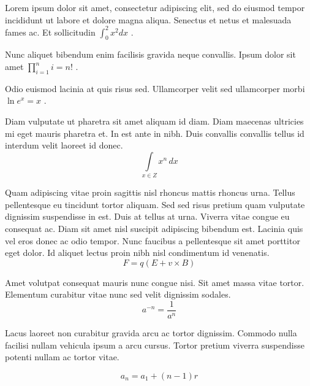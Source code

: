 \documentclass{article}
\begin{document}
Lorem ipsum dolor sit amet, consectetur adipiscing elit, sed do eiusmod tempor incididunt ut labore et dolore magna aliqua. Senectus et netus et malesuada fames ac. Et sollicitudin 
\begin{math}
	\int_0^2x^2dx
\end{math}
.\newline
 
Nunc aliquet bibendum enim facilisis gravida neque convallis. Ipsum dolor sit amet 
$ \prod_{i=1}^ni=n! $
.\newline
    
Odio euismod lacinia at quis risus sed. Ullamcorper velit sed ullamcorper morbi 
\( \ln e^x = x \)
.\newline

Diam vulputate ut pharetra sit amet aliquam id diam. Diam maecenas ultricies mi eget mauris pharetra et. In est ante in nibh. Duis convallis convallis tellus id interdum velit laoreet id donec. 
\[ \int\limits_{x\in Z}\! x^{n}\, dx \]

Quam adipiscing vitae proin sagittis nisl rhoncus mattis rhoncus urna. Tellus pellentesque eu tincidunt tortor aliquam. Sed sed risus pretium quam vulputate dignissim suspendisse in est. Duis at tellus at urna. Viverra vitae congue eu consequat ac. Diam sit amet nisl suscipit adipiscing bibendum est. Lacinia quis vel eros donec ac odio tempor. Nunc faucibus a pellentesque sit amet porttitor eget dolor. Id aliquet lectus proin nibh nisl condimentum id venenatis.
$$ F=q\left ( E+v \times B \right ) $$

Amet volutpat consequat mauris nunc congue nisi. Sit amet massa vitae tortor. Elementum curabitur vitae nunc sed velit dignissim sodales. 
\begin{displaymath}
	a^{-n}=\frac{1}{a^{n}}
\end{displaymath}

Lacus laoreet non curabitur gravida arcu ac tortor dignissim. Commodo nulla facilisi nullam vehicula ipsum a arcu cursus. Tortor pretium viverra suspendisse potenti nullam ac tortor vitae. 

\begin{equation}
	a_{n}=a_{1}+(n-1)r
\end{equation}
\end{document}
